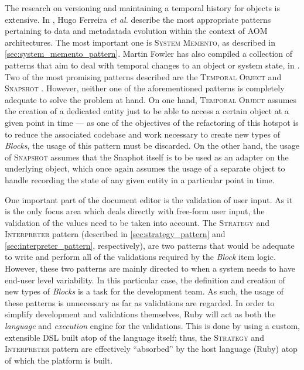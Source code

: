 The research on versioning and maintaining a temporal history for objects is extensive. In \cite{patterns_data_and_metadata_evolution_in_aoms}, Hugo Ferreira \textit{et al.} describe the most appropriate patterns pertaining to data and metadatada evolution within the context of AOM architectures. The most important one is \textsc{System Memento}, as described in \ref{sec:system_memento_pattern}. Martin Fowler has also compiled a collection of patterns that aim to deal with temporal changes to an object or system state, in \cite{fowler_pattern_for_things_that_change_with_time}. Two of the most promising patterns described are the \textsc{Temporal Object} \cite{fowler_temporal_object} and \textsc{Snapshot} \cite{fowler_snapshot}. However, neither one of the aforementioned patterns is completely adequate to solve the problem at hand. On one hand, \textsc{Temporal Object} assumes the creation of a dedicated entity just to be able to access a certain object at a given point in time --- as one of the objectives of the refactoring of this hotspot is to reduce the associated codebase and work necessary to create new types of \emph{Blocks}, the usage of this pattern must be discarded. On the other hand, the usage of \textsc{Snapshot} assumes that the Snaphot itself is to be used as an adapter on the underlying object, which once again assumes the usage of a separate object to handle recording the state of any given entity in a particular point in time.

One important part of the document editor is the validation of user input. As it is the only focus area which deals directly with free-form user input, the validation of the values need to be taken into account. The \textsc{Strategy} and \textsc{Interpreter} pattern (described in \ref{sec:strategy_pattern} and \ref{sec:interpreter_pattern}, respectively), are two patterns that would be adequate to write and perform all of the validations required by the \emph{Block} item logic. However, these two patterns are mainly directed to when a system needs to have end-user level variability. In this particular case, the definition and creation of new types of \emph{Blocks} is a task for the development team. As such, the usage of these patterns is unnecessary as far as validations are regarded. In order to simplify development and validations themselves, Ruby will act as both the \emph{language} and \emph{execution} engine for the validations. This is done by using a custom, extensible DSL built atop of the language itself; thus, the \textsc{Strategy} and \textsc{Interpreter} pattern are effectively ``absorbed'' by the host language (Ruby) atop of which the platform is built.

